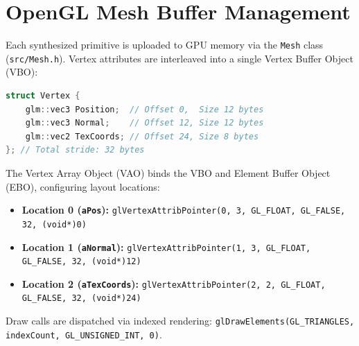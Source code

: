 \section{OpenGL Mesh Buffer Management}
Each synthesized primitive is uploaded to GPU memory via the \texttt{Mesh} class (\texttt{src/Mesh.h}). Vertex attributes are interleaved into a single Vertex Buffer Object (VBO):
\begin{lstlisting}[language=C++, basicstyle=\ttfamily\scriptsize]
struct Vertex {
    glm::vec3 Position;  // Offset 0,  Size 12 bytes
    glm::vec3 Normal;    // Offset 12, Size 12 bytes
    glm::vec2 TexCoords; // Offset 24, Size 8 bytes
}; // Total stride: 32 bytes
\end{lstlisting}
The Vertex Array Object (VAO) binds the VBO and Element Buffer Object (EBO), configuring layout locations:
\begin{itemize}
    \item \textbf{Location 0 (\texttt{aPos}):} \texttt{glVertexAttribPointer(0, 3, GL\_FLOAT, GL\_FALSE, 32, (void*)0)}
    \item \textbf{Location 1 (\texttt{aNormal}):} \texttt{glVertexAttribPointer(1, 3, GL\_FLOAT, GL\_FALSE, 32, (void*)12)}
    \item \textbf{Location 2 (\texttt{aTexCoords}):} \texttt{glVertexAttribPointer(2, 2, GL\_FLOAT, GL\_FALSE, 32, (void*)24)}
\end{itemize}
Draw calls are dispatched via indexed rendering: \texttt{glDrawElements(GL\_TRIANGLES, indexCount, GL\_UNSIGNED\_INT, 0)}.
